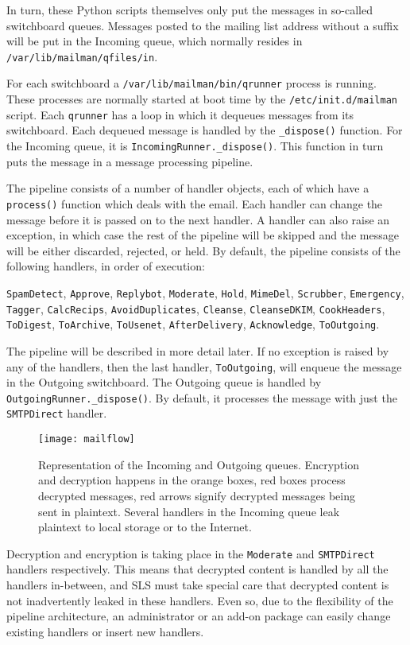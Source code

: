 \documentclass[a4]{article}
\newcommand{\file}[1]{\texttt{#1}}
\newcommand{\func}[1]{\texttt{#1()}}
\newcommand{\cmd}[1]{\texttt{#1}}
\newcommand{\handler}[1]{\texttt{#1}}
\begin{document}
In turn, these Python scripts themselves only put the messages in so-called switchboard queues.
Messages posted to the mailing list address without a suffix will be put in the Incoming queue,
which normally resides in \file{/var/lib/mailman/qfiles/in}.

For each switchboard a \file{/var/lib/mailman/bin/qrunner} process is running.
These processes are normally started at boot time by the \file{/etc/init.d/mailman} script.
Each \cmd{qrunner} has a loop in which it dequeues messages from its switchboard.
Each dequeued message is handled by the \func{\_dispose} function.
For the Incoming queue, it is \func{IncomingRunner.\_dispose}.
This function in turn puts the message in a message processing pipeline.

The pipeline consists of a number of handler objects, each of which have a \func{process} function which deals with the email.
Each handler can change the message before it is passed on to the next handler.
A handler can also raise an exception, in which case the rest of the pipeline will be skipped and the message will
be either discarded, rejected, or held.
By default, the pipeline consists of the following handlers, in order of execution:

\handler{SpamDetect},
\handler{Approve},
\handler{Replybot},
\handler{Moderate},
\handler{Hold},
\handler{MimeDel},
\handler{Scrubber},
\handler{Emergency},
\handler{Tagger},
\handler{CalcRecips},
\handler{AvoidDuplicates},
\handler{Cleanse},
\handler{CleanseDKIM},
\handler{CookHeaders},
\handler{ToDigest},
\handler{ToArchive},
\handler{ToUsenet},
\handler{AfterDelivery},
\handler{Acknowledge},
\handler{ToOutgoing}.

The pipeline will be described in more detail later.
If no exception is raised by any of the handlers,
then the last handler, \handler{ToOutgoing}, will enqueue the message in the Outgoing switchboard.
The Outgoing queue is handled by \func{OutgoingRunner.\_dispose}.
By default, it processes the message with just the \handler{SMTPDirect} handler.

\begin{figure}
\begin{center}
\texttt{[image: mailflow]}
\end{center}
\caption{\small Representation of the Incoming and Outgoing queues.
Encryption and decryption happens in the orange boxes,
red boxes process decrypted messages,
red arrows signify decrypted messages being sent in plaintext.
Several handlers in the Incoming queue leak plaintext to local storage or to the Internet.
}
\label{fig:mailflow}
\end{figure}
Decryption and encryption is taking place in the \handler{Moderate} and \handler{SMTPDirect} handlers respectively.
This means that decrypted content is handled by all the handlers in-between,
and SLS must take special care that decrypted content is not inadvertently leaked in these handlers.
Even so, due to the flexibility of the pipeline architecture, an administrator or an add-on package can easily change existing handlers or insert new handlers.
\end{document}
